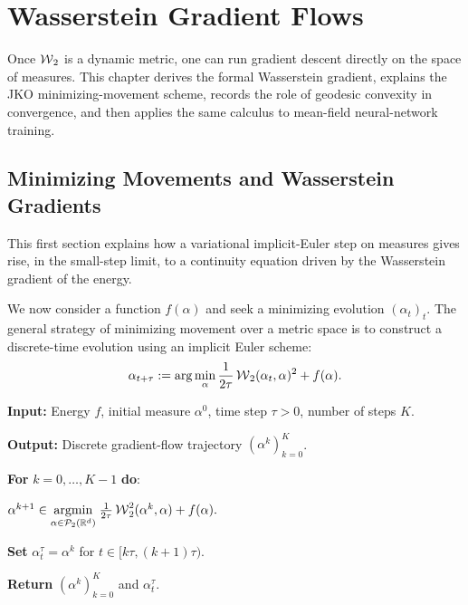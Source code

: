 
\chapter{Wasserstein Gradient Flows}
\label{sec-wasserstein-gradient-flows}

Once $\operatorname{\mathcal{W}}_2$ is a dynamic metric, one can run gradient descent directly on the space of measures. This chapter derives the formal Wasserstein gradient, explains the JKO minimizing-movement scheme, records the role of geodesic convexity in convergence, and then applies the same calculus to mean-field neural-network training.

\section{Minimizing Movements and Wasserstein Gradients}

This first section explains how a variational implicit-Euler step on measures gives rise, in the small-step limit, to a continuity equation driven by the Wasserstein gradient of the energy.

We now consider a function $f(\alpha)$ and seek a minimizing evolution $(\alpha_t)_t$. The general strategy of minimizing movement over a metric space is to construct a discrete-time evolution using an implicit Euler scheme:
\begin{equation}
    \alpha_{t+\tau} := \arg\min_\alpha \frac{1}{2 \tau} \operatorname{\mathcal{W}}_2(\alpha_t, \alpha)^2 + f(\alpha). \label{eq:jko-discr}
\end{equation}

\begin{alg}\label{alg:jko-minimizing-movement}
\textbf{Input:} Energy $f$, initial measure $\alpha^0$, time step $\tau>0$, number of steps $K$.

\textbf{Output:} Discrete gradient-flow trajectory $(\alpha^k)_{k=0}^K$.

\textbf{For} $k=0,\ldots,K-1$ \textbf{do}:
\begin{algblock}
\(\alpha^{k+1} \in \underset{\alpha\in\mathcal{P}_2(\mathbb{R}^d)}{\operatorname{argmin}}\; \frac{1}{2\tau}\operatorname{\mathcal{W}}_2^2(\alpha^k,\alpha)+f(\alpha).\)

\textbf{Set} $\alpha_t^\tau=\alpha^k$ for $t\in[k\tau,(k+1)\tau)$.

\end{algblock}
\algreturnskip
\textbf{Return} $(\alpha^k)_{k=0}^K$ and $\alpha_t^\tau$.
\end{alg}

